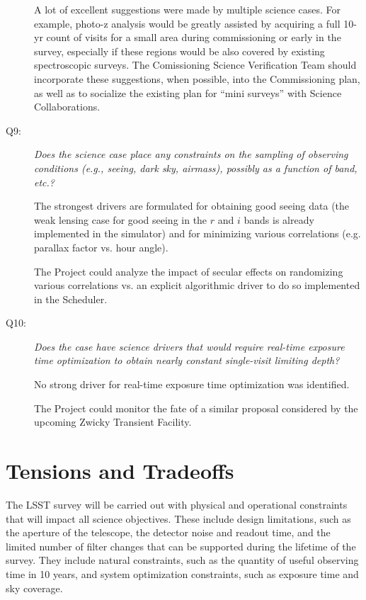 \begin{description}
A lot of excellent suggestions were made by multiple science cases.
For example, photo-z analysis would be greatly assisted by acquiring
a full 10-yr count of visits for a small area during commissioning or
early in the survey, especially if these regions would be also covered by
existing spectroscopic surveys.
The Comissioning Science Verification Team should incorporate these
suggestions, when possible, into the Commissioning plan, as well
as to socialize the existing plan for ``mini surveys'' with Science
Collaborations.


\item[Q9:] {\it Does the science case place any constraints on the
sampling of observing conditions (e.g., seeing, dark sky, airmass),
possibly as a function of band, etc.?}

The strongest drivers are formulated for obtaining good seeing data (the
weak lensing case for good seeing in the $r$ and $i$ bands is already
implemented in the simulator) and for minimizing various correlations
(e.g. parallax factor vs. hour angle).

The Project could analyze the impact of secular effects on randomizing
various correlations vs. an explicit algorithmic driver to do so
implemented in the Scheduler.


\item[Q10:] {\it Does the case have science drivers that would require
real-time exposure time optimization to obtain nearly constant
single-visit limiting depth?}

No strong driver for real-time exposure time optimization was
identified.

The Project could monitor the fate of a similar proposal considered by
the upcoming Zwicky Transient Facility.

\end{description}



\section{Tensions and Tradeoffs}


The LSST survey will be carried out with physical and operational
constraints that will impact all science objectives.  These include
design limitations, such as the aperture of the telescope, the detector
noise and readout time, and the limited number of filter changes that
can be supported during the lifetime of the survey.  They include
natural constraints, such as the quantity of useful observing time
in 10 years, and system optimization constraints, such as
exposure time and sky coverage.

